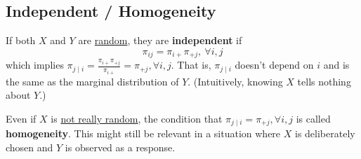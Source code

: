 \documentclass[11pt]{elegantbook}
\begin{document}
\subsection{Independent / Homogeneity}
\begin{definition}[independent]
    \normalfont
    If both $X$ and $Y$ are \underline{random}, they are \textbf{independent} if $$\pi_{ij}=\pi_{i+}\pi_{+j},\ \forall i,j$$
    which implies $\pi_{j\mid i}=\frac{\pi_{i+}\pi_{+j}}{\pi_{i+}}=\pi_{+j},\forall i,j$. That is, $\pi_{j\mid i}$ doesn't depend on $i$ and is the same as the marginal distribution of $Y$. (Intuitively, knowing $X$ tells nothing about $Y$.)
\end{definition}
\begin{definition}[homogeneity]
    \normalfont
    Even if $X$ is \underline{not really random}, the condition that $\pi_{j\mid i}=\pi_{+j},\forall i,j$ is called \textbf{homogeneity}. This might still be relevant in a situation where $X$ is deliberately chosen and $Y$ is observed as a response.
\end{definition}
\end{document}
